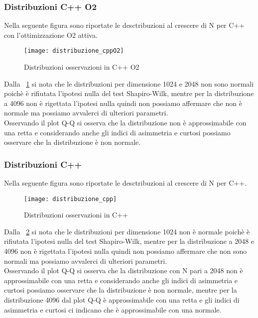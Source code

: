 \clearpage

\subsubsection{Distribuzioni C++ O2}
Nella seguente figura sono riportate le desctribuzioni al crescere di N per C++
con l'ottimizzazione O2 attiva.

\begin{figure}[!htbp]
  \texttt{[image: distribuzione\_cppO2]}
  \caption{Distribuzioni osservazioni in C++ O2}
  \label{distribuzione_cppO2}
\end{figure}
Dalla \figurename~\ref{distribuzione_cppO2} si nota
che le distribuzioni per dimensione 1024 e 2048 non sono normali poichè è rifiutata
l'ipotesi nulla del test Shapiro-Wilk, mentre per la distribuzione a 4096 non è rigettata
l'ipotesi nulla quindi non possiamo affermare che non è normale ma possiamo avvalerci
di ulteriori parametri.\\
Osservando il plot Q-Q si osserva che la distribuzione non è approssimabile con una
retta e considerando anche gli indici di asimmetria e curtosi possiamo osservare che
la distribuzione è non normale.
\clearpage
\subsubsection{Distribuzioni C++ }
Nella seguente figura sono riportate le desctribuzioni al crescere di N per C++.

\begin{figure}[!htbp]
  \texttt{[image: distribuzione\_cpp]}
  \caption{Distribuzioni osservazioni in C++}
  \label{distribuzione_cpp}
\end{figure}

Dalla \figurename~\ref{distribuzione_cpp} si nota
che le distribuzioni per dimensione 1024 non è normale poichè è rifiutata
l'ipotesi nulla del test Shapiro-Wilk, mentre per la distribuzione a 2048 e 4096 non è rigettata
l'ipotesi nulla quindi non possiamo affermare che non sono normali ma possiamo avvalerci
di ulteriori parametri.\\
Osservando il plot Q-Q si osserva che la distribuzione con N pari a 2048 non è approssimabile con una
retta e considerando anche gli indici di asimmetria e curtosi possiamo osservare che
la distribuzione è non normale, mentre per la distribuzione 4096 dal plot Q-Q è approssimabile con una retta
e gli indici di asimmetria e curtosi ci indicano che è approssimabile con una normale.\\
\clearpage
